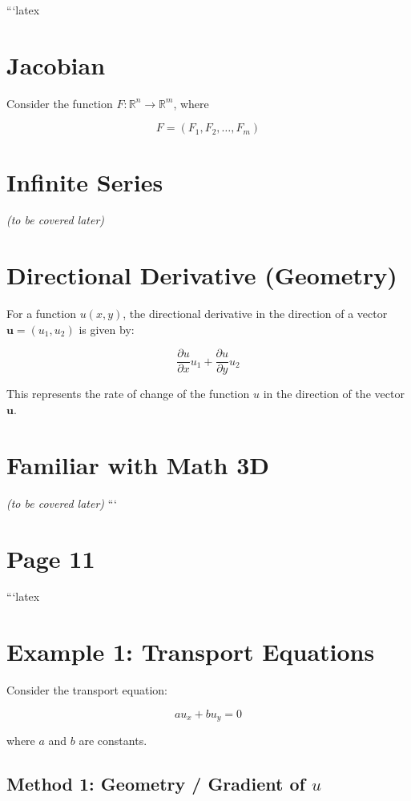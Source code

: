 \documentclass[11pt]{article}
\begin{document}
```latex
\section*{Jacobian}

Consider the function \( F : \mathbb{R}^n \to \mathbb{R}^m \), where

\[
F = (F_1, F_2, \ldots, F_m)
\]

\section*{Infinite Series}

\emph{(to be covered later)}

\section*{Directional Derivative (Geometry)}

For a function \( u(x, y) \), the directional derivative in the direction of a vector \(\mathbf{u} = (u_1, u_2)\) is given by:

\begin{equation}
    \frac{\partial u}{\partial x} u_1 + \frac{\partial u}{\partial y} u_2
\end{equation}

This represents the rate of change of the function \( u \) in the direction of the vector \(\mathbf{u}\).

\section*{Familiar with Math 3D}

\emph{(to be covered later)}
```
\clearpage
\section*{Page 11}

```latex
\section*{Example 1: Transport Equations}

Consider the transport equation:

\begin{equation}
    a u_x + b u_y = 0
\end{equation}

where \(a\) and \(b\) are constants.

\subsection*{Method 1: Geometry / Gradient of \(u\)}
\end{document}
